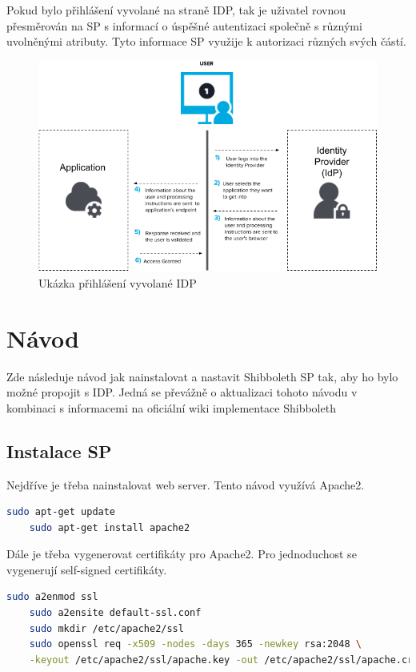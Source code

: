Pokud bylo přihlášení vyvolané na straně IDP, tak je uživatel rovnou přesměrován na SP s informací o úspěšné autentizaci společně s různými uvolněnými atributy.
Tyto informace SP využije k autorizaci různých svých částí.\cite{SAMLxOIDC}

\begin{figure}[bp]
	\centering
    \includegraphics[width=1\textwidth]{obrazky-figures/saml-idp-cropped.png}
	\caption{Ukázka přihlášení vyvolané IDP\cite{SAMLxOIDC}}
	\label{saml-flow-idp}
\end{figure}
\chapter{Návod}
\label{návod}

Zde následuje návod jak nainstalovat a nastavit Shibboleth SP tak, aby ho bylo možné propojit s IDP. Jedná se převážně o aktualizaci tohoto návodu\cite{shibbolethSpInstallation} v kombinaci s informacemi na oficiální wiki implementace Shibboleth\cite{shibbolethWikiSP}

\section{Instalace SP}

Nejdříve je třeba nainstalovat web server. Tento návod využívá Apache2.
\begin{lstlisting}[language=Bash]
    sudo apt-get update
    sudo apt-get install apache2
\end{lstlisting}

Dále je třeba vygenerovat certifikáty pro Apache2. Pro jednoduchost se vygenerují self-signed certifikáty.
\begin{lstlisting}[language=Bash]
    sudo a2enmod ssl
    sudo a2ensite default-ssl.conf
    sudo mkdir /etc/apache2/ssl
    sudo openssl req -x509 -nodes -days 365 -newkey rsa:2048 \
    -keyout /etc/apache2/ssl/apache.key -out /etc/apache2/ssl/apache.crt
\end{lstlisting}

